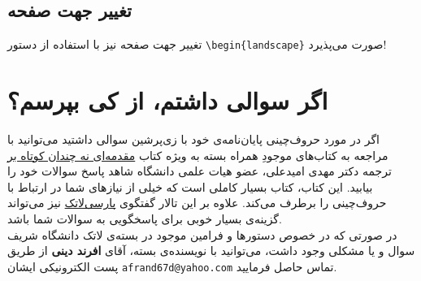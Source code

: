 \subsection{تغییر جهت صفحه}
تغییر جهت صفحه نیز با استفاده از دستور 
\verb!\begin{landscape}!
 صورت می‌پذیرد!

\section{اگر سوالی داشتم، از کی بپرسم؟}
اگر در مورد حروف‌چینی پایان‌نامه‌ی خود با زی‌پرشین سوالی داشتید می‌توانید با مراجعه به کتاب‌های موجودِ همراه بسته به ویژه کتاب
\href{http://www.tug.ctan.org/tex-archive/info/lshort/persian/lshort.pdf}{مقدمه‌ای نه چندان کوتاه بر \lr{\LaTeXe}}
ترجمه دکتر مهدی امیدعلی، عضو هیات علمی دانشگاه شاهد پاسخ سوالات خود را بیابید. این کتاب، کتاب بسیار کاملی است که خیلی از نیازهای شما در ارتباط با حروف‌چینی را برطرف می‌کند. علاوه بر این تالار گفتگوی 
\href{http://forum.parsilatex.com}{پارسی‌لاتک}
نیز می‌تواند گزینه‌ی بسیار خوبی برای پاسخگویی به سوالات شما باشد.\\
در صورتی که در خصوص دستورها و فرامین موجود در بسته‌ی لاتک دانشگاه شریف سوال و یا مشکلی وجود داشت، می‌توانید با نویسنده‌ی بسته، آقای \textbf{افرند دینی} از طریق پست الکترونیکی ایشان
\verb!afrand67d@yahoo.com!
تماس حاصل فرمایید.